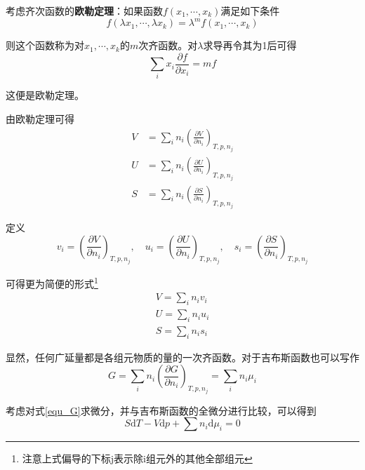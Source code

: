 \documentclass[UTF8]{ctexart}
\begin{document}
考虑齐次函数的\textbf{欧勒定理}：如果函数$f\left(x_{1}, \cdots, x_{k}\right)$满足如下条件
\begin{equation}
f\left(\lambda x_{1}, \cdots, \lambda x_{k}\right)=\lambda^{m} f\left(x_{1}, \cdots, x_{k}\right)
\end{equation}

\noindent 则这个函数称为对$ x_{1},\cdots, x_{k} $的$ m $次齐函数。对$ \lambda $求导再令其为1后可得
\begin{equation}
\sum_{i} x_{i} \frac{\partial f}{\partial x_{i}}=m f
\end{equation}

\noindent 这便是欧勒定理。

	由欧勒定理可得
	\begin{equation}
	\begin{aligned}V&=\sum_{i} n_{i}\left(\frac{\partial V}{\partial n_{i}}\right)_{T, p, n_{j}} \\ U&=\sum_{i} n_{i}\left(\frac{\partial U}{\partial n_{i}}\right)_{T, p, n_{j}} \\ S&=\sum_{i} n_{i}\left(\frac{\partial S}{\partial n_{i}}\right)_{T, p, n_{j}}\end{aligned}
	\end{equation}
	
\noindent 定义
\begin{equation}
v_{i}=\left(\frac{\partial V}{\partial n_{i}}\right)_{T, p, n_{j}}, \quad u_{i}=\left(\frac{\partial U}{\partial n_{i}}\right)_{T, p, n_{j}}, \quad s_{i}=\left(\frac{\partial S}{\partial n_{i}}\right)_{T, p, n_{j}}
\end{equation}

\noindent 可得更为简便的形式\footnote{注意上式偏导的下标j表示除i组元外的其他全部组元}
\begin{equation}
\begin{aligned}V=\sum_{i} n_{i} v_{i} \\ U=\sum_{i} n_{i} u_{i} \\ S=\sum_{i} n_{i} s_{i}\end{aligned}
\end{equation}

	显然，任何广延量都是各组元物质的量的一次齐函数。对于吉布斯函数也可以写作
	\begin{equation}
	G=\sum_{i} n_{i}\left(\frac{\partial G}{\partial n_{i}}\right)_{T, p, n_{j}}=\sum_{i} n_{i} \mu_{i}\label{equ_G}
	\end{equation}
	
	考虑对式\ref{equ_G}求微分，并与吉布斯函数的全微分进行比较，可以得到
	\begin{equation}
	S \mathrm{d} T-V \mathrm{d} p+\sum n_{i} \mathrm{d} \mu_{i}=0\label{equ_GBS}
	\end{equation}
\end{document}
